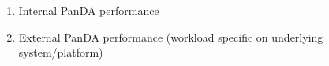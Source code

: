 \begin{enumerate}
  \item Internal PanDA performance
  \item External PanDA performance (workload specific on underlying system/platform)
\end{enumerate}
